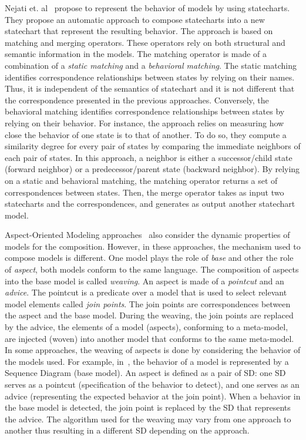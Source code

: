 Nejati et. al~\cite{compostatechartsbib} propose to represent the behavior of models by using statecharts. They propose an automatic approach to compose statecharts into a new statechart that represent the resulting behavior. The approach is based on matching and merging operators. These operators rely on both structural and semantic information in the models. The matching operator is made of a combination of a \emph{static matching} and a \emph{behavioral matching}. The static matching identifies correspondence relationships between states by relying on their names. Thus, it is independent of the semantics of statechart and it is not different that the correspondence presented in the previous approaches. Conversely, the behavioral matching identifies correspondence relationships between states by relying on their behavior. For instance, the approach relies on measuring how close the behavior of one state is to that of another. To do so, they compute a similarity degree for every pair of states by comparing the immediate neighbors of each pair of states. In this approach, a neighbor is either a successor/child state (forward neighbor) or a predecessor/parent state (backward neighbor). By relying on a static and behavioral matching, the matching operator returns a set of correspondences between states. Then, the merge operator takes as input two statecharts and the correspondences, and generates as output another statechart model.
       
Aspect-Oriented Modeling approaches~\cite{weavingbib} also consider the dynamic properties of models for the composition. However, in these approaches, the mechanism used to compose models is different. One model plays the role of \emph{base} and other the role of \emph{aspect}, both models conform to the same language. The composition of aspects into the base model is called \emph{weaving}. An aspect is made of a \emph{pointcut} and an \emph{advice}. The pointcut is a predicate over a model that is used to select relevant model elements called \emph{join points}. The join points are correspondences between the aspect and the base model. During the weaving, the join points are replaced by the advice, \ie the elements of a model (aspects), conforming to a meta-model, are injected (woven) into another model that conforms to the same meta-model. In some approaches, the weaving of aspects is done by considering the behavior of the models used. For example, in~\cite{sequenceweavingbib,rambib,composdbib}, the behavior of a model is represented by a Sequence Diagram (base model). An aspect is defined as a pair of SD: one SD serves as a pointcut (specification of the behavior to detect), and one serves as an advice (representing the expected behavior at the join point). When a behavior in the base model is detected, the join point is replaced by the SD that represents the advice. The algorithm used for the weaving may vary from one approach to another thus resulting in a different SD depending on the approach. 

